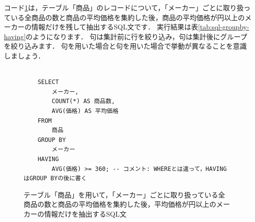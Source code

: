 コード\ref{code:sql-groupby-having}は，テーブル「商品」のレコードについて，「メーカー」ごとに取り扱っている全商品の数と商品の平均価格を集約した後，商品の平均価格が円以上のメーカーの情報だけを残して抽出するSQL文です．
実行結果は表\ref{tab:sql-groupby-having}のようになります．
句は集計前に行を絞り込み，句は集計後にグループを絞り込みます．
句を用いた場合と句を用いた場合で挙動が異なることを意識しましょう．
\begin{figure}[!htbp]
    \begin{verbatim}

    SELECT
        メーカー,
        COUNT(*) AS 商品数,
        AVG(価格) AS 平均価格
    FROM
        商品
    GROUP BY
        メーカー
    HAVING
        AVG(価格) >= 360; -- コメント: WHEREとは違って，HAVINGはGROUP BYの後に書く

    \end{verbatim}
    \captionsetup{name=コード}
    \caption{テーブル「商品」を用いて，「メーカー」ごとに取り扱っている全商品の数と商品の平均価格を集約した後，平均価格が円以上のメーカーの情報だけを抽出するSQL文}
    \label{code:sql-groupby-having}
\end{figure}
\begin{table}[!htbp]
    \centering
    \caption{テーブル「商品」を用いて，「メーカー」ごとに取り扱っている全商品の数と商品の平均価格を集約した後，平均価格が円以上のメーカーの情報だけを抽出した結果}
    \label{tab:sql-groupby-having}
\end{table}

